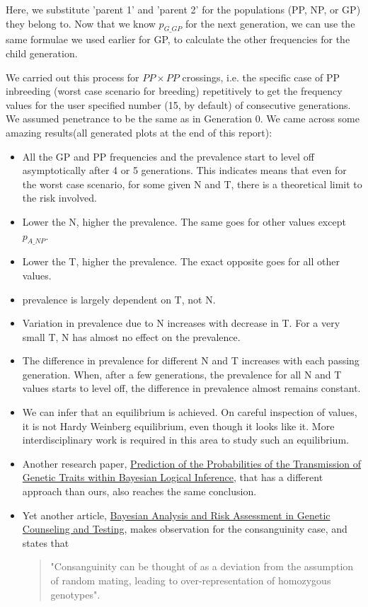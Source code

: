 \documentclass{article}
\begin{document}
Here, we substitute 'parent 1' and 'parent 2' for the populations (PP, NP, or GP) they belong to. Now that we know $p_{G\_GP}$ for the next generation, we can use the same formulae we used earlier for GP, to calculate the other frequencies for the child generation.

We carried out this process for $PP\times PP$ crossings, i.e. the specific case of PP inbreeding (worst case scenario for breeding) repetitively to get the frequency values for the user specified number (15, by default) of consecutive generations. We assumed penetrance to be the same as in Generation 0. We came across some amazing results(all generated plots at the end of this report):

\begin{itemize}
    \item All the GP and PP frequencies and the prevalence  start to level off asymptotically after 4 or 5 generations. This indicates means that even for the worst case scenario, for some given N and T, there is a theoretical limit to the risk involved.
    
    \item Lower the N, higher the prevalence. The same goes for other values except $p_{A\_NP}$.
    \item Lower the T, higher the prevalence. The exact opposite goes for all other values.
    \item prevalence is largely dependent on T, not N.
    \item Variation in prevalence due to N increases with decrease in T. For a very small T, N has almost no effect on the prevalence.
    \item The difference in prevalence for different N and T increases with each passing generation. When, after a few generations, the prevalence for all N and T values starts to level off, the difference in prevalence almost remains constant.
    \item We can infer that an equilibrium is achieved. On careful inspection of values, it is not Hardy Weinberg equilibrium, even though it looks like it. More interdisciplinary work is required in this area to study such an equilibrium.
    \item Another research paper, \href{http://przyrbwn.icm.edu.pl/APP/PDF/130/a130z1p012.pdf}{Prediction of the Probabilities of the Transmission of Genetic Traits within Bayesian Logical Inference}, that has a different approach than ours, also reaches the same conclusion.
    
    \item Yet another article, \href{https://www.ncbi.nlm.nih.gov/pmc/articles/PMC1867463/}{Bayesian Analysis and Risk Assessment in Genetic Counseling and Testing}, makes observation for the consanguinity case, and states that \begin{quote}
        "Consanguinity can be thought of as a deviation from the assumption of random mating, leading to over-representation of homozygous genotypes".
    \end{quote}
    

\end{itemize}
\end{document}
